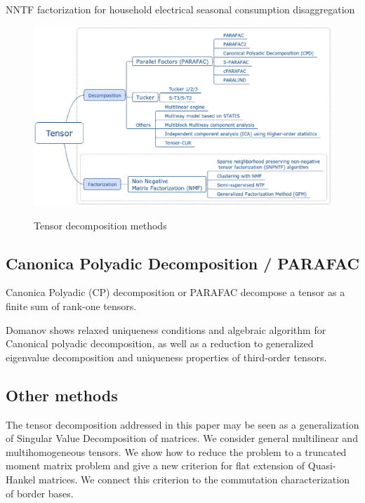 \documentclass[letterpaper,12pt]{article}
\begin{document}
\cite{Figueiredo2014} NNTF factorization for household electrical seasonal consumption disaggregation



\begin{figure}[!ht]
\centering
 \includegraphics[scale=0.5]{Images/tensor_decomposition_methods.eps}\label{fig:methods}
 \caption{Tensor decomposition methods}
\end{figure}


\subsection{Canonica Polyadic Decomposition / PARAFAC}

Canonica Polyadic (CP) decomposition or PARAFAC decompose a tensor as a finite sum of rank-one tensors.


Domanov \cite{Domanov2015} shows relaxed uniqueness conditions and algebraic algorithm for Canonical polyadic decomposition, as well as a reduction to generalized eigenvalue decomposition \cite{Domanov2014} and uniqueness properties \cite{Domanov2013} of third-order tensors.






\subsection{Other methods}

\cite{Bernardi2013} The tensor decomposition addressed in this paper may be seen as a generalization of Singular Value Decomposition of matrices. We consider general multilinear and multihomogeneous tensors. We show how to reduce the problem to a truncated moment matrix problem and give a new criterion for flat extension of Quasi-Hankel matrices. We connect this criterion to the commutation characterization of border bases.
\end{document}
